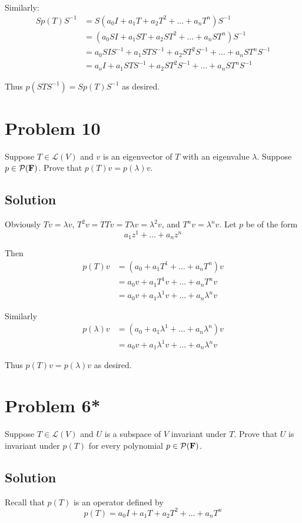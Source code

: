 \documentclass{article}
\begin{document}
Similarly:
\begin{align*}
Sp(T)S^{-1}&=S(a_0I + a_1T+a_2T^2+\ldots+a_n T^n)S^{-1}\\
&=(a_0SI + a_1ST+a_2ST^2+\ldots+a_n ST^n)S^{-1}\\
&=a_0SIS^{-1} + a_1STS^{-1}+a_2ST^2S^{-1}+\ldots+a_n ST^nS^{-1}\\
&=a_oI + a_1STS^{-1}+a_2ST^2S^{-1}+\ldots+a_n ST^nS^{-1}
\end{align*}

Thus $p(STS^{-1})=Sp(T)S^{-1}$ as desired.

\section*{Problem 10}
Suppose $T\in\mathcal{L}(V)$ and $v$ is an eigenvector of $T$ with an eigenvalue $\lambda$. Suppose $p\in\mathcal{P}(\mathbf{F})$. Prove that $p(T)v=p(\lambda)v$.

\subsection*{Solution}
Obviously $Tv=\lambda v$, $T^2v=TTv=T\lambda v=\lambda^2 v$, and $T^n v=\lambda^n v$. Let $p$ be of the form
\[a_1z^1+\ldots+a_n z^n\]

Then
\begin{align*}
    p(T)v&=(a_0 + a_1T^1+\ldots+a_n T^n)v\\
         &=a_0v+a_1T^1v+\ldots+a_n T^n v\\
         &=a_0v+a_1\lambda^1v+\ldots+a_n\lambda^n v
\end{align*}

Similarly
\begin{align*}
p(\lambda)v&=(a_0+a_1\lambda^1+\ldots+a_n\lambda^n)v\\
           &=a_0v+a_1\lambda^1v+\ldots+a_n\lambda^n v
\end{align*}

Thus $p(T)v=p(\lambda)v$ as desired.

\section*{Problem 6*}
Suppose $T\in\mathcal{L}(V)$ and $U$ is a subspace of $V$ invariant under $T$. Prove that $U$ is invariant under $p(T)$ for every polynomial $p\in\mathcal{P}(\mathbf{F})$.

\subsection*{Solution}
Recall that $p(T)$ is an operator defined by
\[p(T)=a_0I + a_1T+a_2T^2+\ldots+a_n T^n\]
\end{document}
